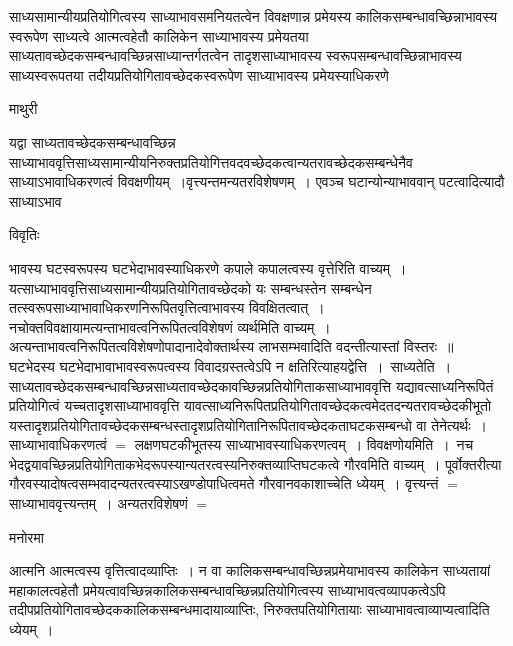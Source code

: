 \documentclass[10pt, openany]{book}
\begin{document}
{साध्यसामान्यीयप्रतियोगित्वस्य साध्याभावसमनियतत्वेन विवक्षणान्न प्रमेयस्य कालिकसम्बन्धावच्छिन्नाभावस्य स्वरूपेण साध्यत्वे आत्मत्वहेतौ कालिकेन साध्याभावस्य प्रमेयतया
साध्यतावच्छेदकसम्बन्धावच्छिन्नसाध्यान्तर्गतत्वेन तादृशसाध्याभावस्य स्वरूपसम्बन्धावच्छिन्नाभावस्य साध्यस्वरूपतया तदीयप्रतियोगितावच्छेदकस्वरूपेण साध्याभावस्य
प्रमेयस्याधिकरणे
\newpage
\begin{center}  माथुरी  \end{center}

{\la यद्वा साध्यतावच्छेदकसम्बन्धावच्छिन्न साध्याभाववृत्तिसाध्यसामान्यीयनिरुक्तप्रतियोगित्तवदवच्छेदकत्वान्यतरावच्छेदकसम्बन्धेनैव साध्याऽभावाधिकरणत्वं विवक्षणीयम्~।वृत्त्यन्तमन्यतरविशेषणम्~। एवञ्च घटान्योन्याभाववान् पटत्वादित्यादौ साध्याऽभाव}
\begin{center}     विवृतिः \end{center}
भावस्य घटस्वरूपस्य घटभेदाभावस्याधिकरणे कपाले कपालत्वस्य वृत्तेरिति वाच्यम्~। यत्साध्याभाववृत्तिसाध्यसामान्यीयप्रतियोगितावच्छेदको यः सम्बन्धस्तेन सम्बन्धेन तत्स्वरूपसाध्याभावाधिकरणनिरूपितवृत्तित्वाभावस्य विवक्षितत्वात्~। नचोक्तविवक्षायामत्यन्ताभावत्वनिरूपितत्वविशेषणं व्यर्थमिति वाच्यम्~।अत्यन्ताभावत्वनिरूपितत्वविशेषणोपादानादेवोक्तार्थस्य लाभसम्भवादिति वदन्तीत्यास्तां विस्तरः~॥\\

घटभेदस्य घटभेदाभावाभावस्वरूपत्वस्य विवादग्रस्तत्वेऽपि न क्षतिरित्याह\textendash  यद्वेत्ति~।~{\la साध्यतेति~।}
साध्यतावच्छेदकसम्बन्धावच्छिन्नसाध्यतावच्छेदकावच्छिन्नप्रतियोगिताकसाध्याभाववृत्ति यद्यावत्साध्यनिरूपितं प्रतियोगित्वं यच्चतादृशसाध्याभाववृत्ति यावत्साध्यनिरूपितप्रतियोगितावच्छेदकत्वमेदतदन्यतरावच्छेदकीभूतो यस्तादृशप्रतियोगितावच्छेदकसम्बन्धस्तादृशप्रतियोगितानिरूपितावच्छेदकताघटकसम्बन्धो वा तेनेत्यर्थः~। साध्याभावाधिकरणत्वं $=$ लक्षणघटकीभूतस्य साध्याभावस्याधिकरणत्वम्~। {\qt विवक्षणोयमिति~}।~नच भेदद्वयावच्छिन्नप्रतियोगिताकभेदरूपस्यान्यतरत्वस्यनिरुक्तव्याप्तिघटकत्वे गौरवमिति वाच्यम्~। पूर्वोक्तरीत्या गौरवस्यादोषत्वसम्भवादन्यतरत्वस्याऽखण्डोपाधित्वमते गौरवानवकाशाच्चेति ध्येयम्~। वृत्त्यन्तं $=$ साध्याभाववृत्त्यन्तम्~। अन्यतरविशेषणं $=$ 
\begin{center}   मनोरमा  \end{center}
आत्मनि आत्मत्वस्य वृत्तित्वादव्याप्तिः~। न वा कालिकसम्बन्धावच्छिन्नप्रमेयाभावस्य कालिकेन साध्यतायां महाकालत्वहेतौ प्रमेयत्वावच्छिन्नकालिकसम्बन्धावच्छिन्नप्रतियोगित्वस्य साध्याभावत्वव्यापकत्वेऽपि तदीपप्रतियोगितावच्छेदककालिकसम्बन्धमादायाव्याप्तिः, निरुक्तपतियोगितायाः साध्याभावत्वाव्याप्यत्वादिति ध्येयम्~।\\

}
\end{document}
